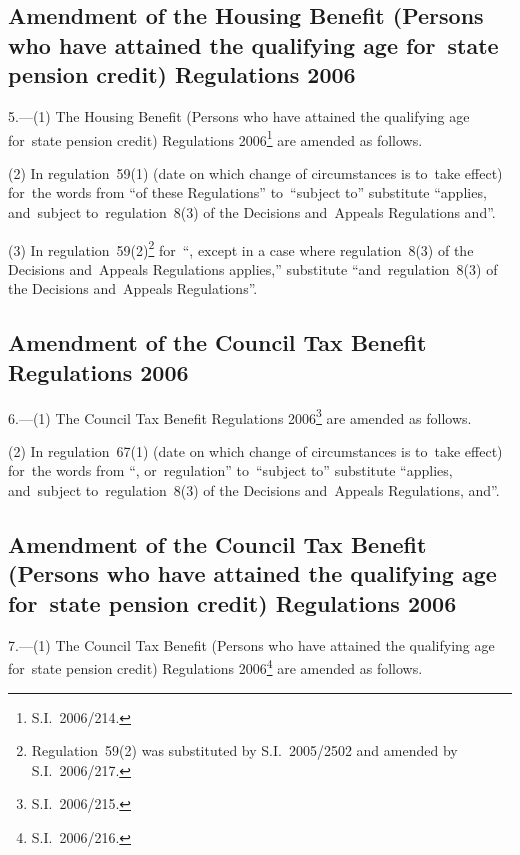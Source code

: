 \documentclass[12pt,a4paper]{article}
\begin{document}
\subsection[5. Amendment of the Housing Benefit (Persons who have attained the qualifying age for~state pension credit) Regulations 2006]{Amendment of the Housing Benefit (Persons who have attained the qualifying age for~state pension credit) Regulations 2006}

5.---(1)  The Housing Benefit (Persons who have attained the qualifying age for~state pension credit) Regulations 2006\footnote{S.I.~2006/214.} are amended as follows.

(2) In regulation~59(1) (date on which change of circumstances is to~take effect) for~the words from “of these Regulations” to~“subject to” substitute “applies, and~subject to~regulation~8(3) of the Decisions and~Appeals Regulations and”.

(3) In regulation~59(2)\footnote{Regulation~59(2) was substituted by S.I.~2005/2502 and amended by S.I.~2006/217.} for~“, except in a case where regulation~8(3) of the Decisions and~Appeals Regulations applies,” substitute “and~regulation~8(3) of the Decisions and~Appeals Regulations”.

\subsection[6. Amendment of the Council Tax Benefit Regulations 2006]{\sloppy Amendment of the Council Tax Benefit Regulations 2006}

6.---(1)  The Council Tax Benefit Regulations 2006\footnote{S.I.~2006/215.} are amended as follows.

(2) In regulation~67(1) (date on which change of circumstances is to~take effect) for~the words from “, or~regulation” to~“subject to” substitute “applies, and~subject to~regulation~8(3) of the Decisions and~Appeals Regulations, and”.

\subsection[7. Amendment of the Council Tax Benefit (Persons who have attained the qualifying age for~state pension credit) Regulations 2006]{Amendment of the Council Tax Benefit (Persons who have attained the qualifying age for~state pension credit) Regulations 2006}

7.---(1)  The Council Tax Benefit (Persons who have attained the qualifying age for~state pension credit) Regulations 2006\footnote{S.I.~2006/216.} are amended as follows.
\end{document}
